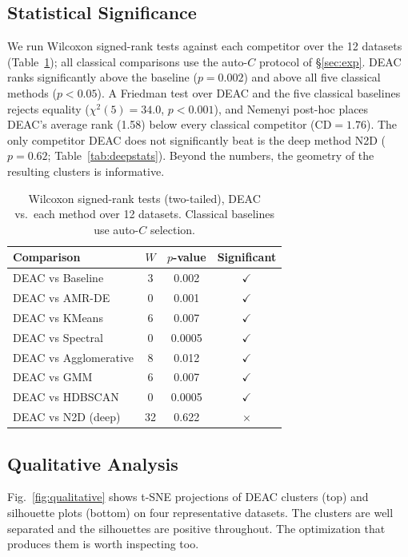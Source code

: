 \documentclass[journal]{IEEEtran}
\begin{document}
\subsection{Statistical Significance}

We run Wilcoxon signed-rank tests against each competitor over the 12 datasets (Table~\ref{tab:stats}); all classical comparisons use the auto-$C$ protocol of \S\ref{sec:exp}. DEAC ranks significantly above the baseline ($p{=}0.002$) and above all five classical methods ($p<0.05$). A Friedman test over DEAC and the five classical baselines rejects equality ($\chi^2(5){=}34.0$, $p{<}0.001$), and Nemenyi post-hoc places DEAC's average rank (1.58) below every classical competitor (CD${=}1.76$). The only competitor DEAC does not significantly beat is the deep method N2D ($p{=}0.62$; Table~\ref{tab:deepstats}). Beyond the numbers, the geometry of the resulting clusters is informative.

\begin{table}[htbp]
\centering
\caption{Wilcoxon signed-rank tests (two-tailed), DEAC vs.\ each method over 12 datasets. Classical baselines use auto-$C$ selection.}
\label{tab:stats}
\footnotesize
\begin{tabular}{lccc}
\toprule
Comparison & $W$ & $p$-value & Significant \\
\midrule
DEAC vs Baseline      & 3 & 0.002 & $\checkmark$ \\
DEAC vs AMR-DE        & 0 & 0.001 & $\checkmark$ \\
DEAC vs KMeans        & 6 & 0.007 & $\checkmark$ \\
DEAC vs Spectral      & 0 & 0.0005 & $\checkmark$ \\
DEAC vs Agglomerative & 8 & 0.012 & $\checkmark$ \\
DEAC vs GMM           & 6 & 0.007 & $\checkmark$ \\
DEAC vs HDBSCAN       & 0 & 0.0005 & $\checkmark$ \\
DEAC vs N2D (deep)    & 32 & 0.622 & $\times$ \\
\bottomrule
\end{tabular}
\end{table}

\subsection{Qualitative Analysis}

Fig.~\ref{fig:qualitative} shows t-SNE projections of DEAC clusters (top) and silhouette plots (bottom) on four representative datasets. The clusters are well separated and the silhouettes are positive throughout. The optimization that produces them is worth inspecting too.
\end{document}
